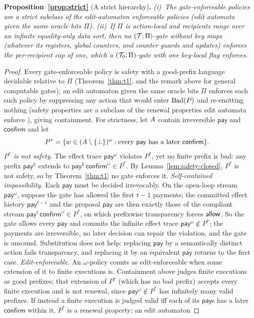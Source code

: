 \medskip
\noindent\textbf{Proposition~\ref{prop:strict}} (A strict hierarchy)\textbf{.}
\emph{(i)~The gate-enforceable policies are a strict subclass of the edit-automaton
enforceable policies (edit automata given the same oracle bits $\Pi$). (ii)~If $\Pi$ is action-local and recipients range
over an infinite equality-only data sort, then no $(\mathcal{T};\Pi)$-gate without key maps (whatever its registers, global counters,
and counter guards and updates) enforces the per-recipient cap of one, which a $(\mathcal{T}_0;\Pi)$-gate with one key-local flag
enforces.}

\begin{proof}
Every gate-enforceable policy is safety with a good-prefix language decidable relative to $\Pi$
(Theorem~\ref{thm:t1}, and the remark above for general computable gates); an edit automaton given the same oracle bits $\Pi$ enforces each such policy by suppressing any action
that would enter $\mathrm{Bad}(P)$ and re-emitting nothing (safety properties are a subclass of
the renewal properties edit automata enforce \citep{ligatti2005edit,ligatti2009nonsafety}),
giving containment. For strictness,
let $A$ contain irreversible $\mathsf{pay}$ and $\mathsf{confirm}$ and let
\[
  P^{\ast}=\{w\in(A\setminus\{\bot\})^{\omega}:\text{every }\mathsf{pay}\text{ has a later }\mathsf{confirm}\}.
\]
\emph{$P^{\ast}$ is not safety.} The effect trace $\mathsf{pay}^{\omega}$ violates
$P^{\ast}$, yet no finite prefix is bad: any prefix $\mathsf{pay}^{k}$ extends to
$\mathsf{pay}^{k}\,\mathsf{confirm}^{\omega}\in P^{\ast}$.
By Lemma~\ref{lem:safety-closed}, $P^{\ast}$ is not safety, so by Theorem~\ref{thm:t1} no
gate enforces it. \emph{Self-contained impossibility.} Each $\mathsf{pay}$ must be
decided irrevocably. On the open-loop stream $\mathsf{pay}^{\omega}$, suppose the gate
has allowed the first $t-1$ payments; the committed effect history $\mathsf{pay}^{t-1}$
and the proposal $\mathsf{pay}$ are then exactly those of the compliant stream
$\mathsf{pay}^{t}\,\mathsf{confirm}^{\omega}\in P^{\ast}$, on which prefixwise
transparency forces $\mathsf{allow}$. So the gate allows every $\mathsf{pay}$ and commits the
infinite effect trace $\mathsf{pay}^{\omega}\notin P^{\ast}$; the payments are
irreversible, no later decision can repair the violation, and the gate is unsound. Substitution does not help:
replacing $\mathsf{pay}$ by a semantically distinct action fails transparency,
and replacing it by an equivalent $\mathsf{pay}$ returns to the first case.
\emph{Edit-enforceable.} An $\omega$-policy counts as edit-enforceable when some extension of it to finite executions is. Containment above judges finite executions as good prefixes; that extension of $P^{\ast}$ (which has no bad prefix) accepts every finite execution and is not renewal, since $\mathsf{pay}^{\omega}\notin P^{\ast}$ has infinitely many valid prefixes. If instead a finite execution is judged valid iff each of its $\mathsf{pay}$s has a later $\mathsf{confirm}$ within it, $P^{\ast}$ is a renewal property; an edit automaton

\end{proof}
